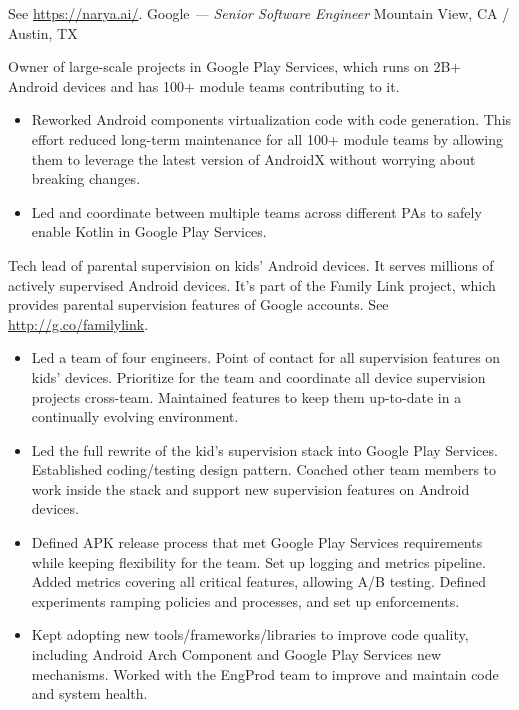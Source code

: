\documentclass[]{friggeri-cv} %
\begin{document}
\begin{entrylist}
{    See \url{https://narya.ai/}.
  }
  {Google \emph{--- Senior Software Engineer}}
  {Mountain View, CA / Austin, TX}
  {
    Owner of large-scale projects in Google Play Services,
    which runs on 2B+ Android devices and has 100+ module teams contributing to it.
    \begin{itemize}
      \item Reworked Android components virtualization code with code generation.
      This effort reduced long-term maintenance for all 100+ module teams
      by allowing them to leverage the latest version of AndroidX without worrying about breaking changes.
      \item Led and coordinate between multiple teams across different PAs to safely enable Kotlin in Google Play Services.
    \end{itemize}
    Tech lead of parental supervision on kids' Android devices. It serves millions of actively supervised Android devices.
    It's part of the Family Link project, which provides parental supervision features of Google accounts.
    See \url{http://g.co/familylink}.
    \begin{itemize}
      \item Led a team of four engineers.
      Point of contact for all supervision features on kids' devices.
      Prioritize for the team and coordinate all device supervision projects cross-team.
      Maintained features to keep them up-to-date in a continually evolving environment.
      \item Led the full rewrite of the kid's supervision stack into Google Play Services.
      Established coding/testing design pattern.
      Coached other team members to work inside the stack and support new supervision features on Android devices.
      \item Defined APK release process that met Google Play Services requirements while keeping flexibility for the team.
      Set up logging and metrics pipeline.
      Added metrics covering all critical features, allowing A/B testing.
      Defined experiments ramping policies and processes, and set up enforcements.
      \item Kept adopting new tools/frameworks/libraries to improve code quality,
      including Android Arch Component and Google Play Services new mechanisms.
      Worked with the EngProd team to improve and maintain code and system health.
    \end{itemize}
  }
  \end{entrylist}
\end{document}
